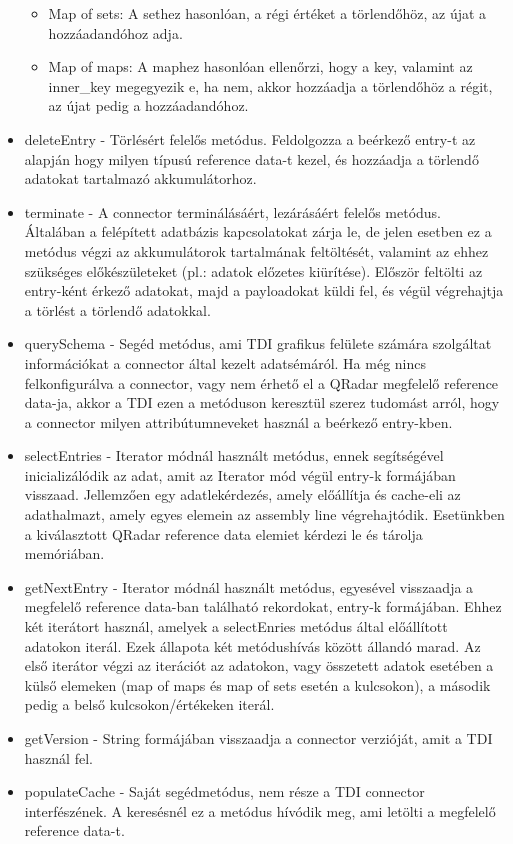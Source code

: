 \begin{itemize}
\begin{itemize}
		\item Map of sets: A sethez hasonlóan, a régi értéket a törlendőhöz, az újat a hozzáadandóhoz adja.
		
		\item Map of maps: A maphez hasonlóan ellenőrzi, hogy a key, valamint az inner\_key megegyezik e, ha nem, akkor hozzáadja a törlendőhöz a régit, az újat pedig a hozzáadandóhoz.
	\end{itemize}

	\item deleteEntry - Törlésért felelős metódus. Feldolgozza a beérkező entry-t az alapján hogy milyen típusú reference data-t kezel, és hozzáadja a törlendő adatokat tartalmazó akkumulátorhoz.
	
	\item terminate - A connector terminálásáért, lezárásáért felelős metódus. Általában a felépített adatbázis kapcsolatokat zárja le, de jelen esetben ez a metódus végzi az akkumulátorok tartalmának feltöltését, valamint az ehhez szükséges előkészületeket (pl.: adatok előzetes kiürítése). Először feltölti az entry-ként érkező adatokat, majd a payloadokat küldi fel, és végül végrehajtja a törlést a törlendő adatokkal.
	
	\item querySchema - Segéd metódus, ami TDI grafikus felülete számára szolgáltat információkat a connector által kezelt adatsémáról. Ha még nincs felkonfigurálva a connector, vagy nem érhető el a QRadar megfelelő reference data-ja, akkor a TDI ezen a metóduson keresztül szerez tudomást arról, hogy a connector milyen attribútumneveket használ a beérkező entry-kben.
		
	\item selectEntries - Iterator módnál használt metódus, ennek segítségével inicializálódik az adat, amit az Iterator mód végül entry-k formájában visszaad. Jellemzően egy adatlekérdezés, amely előállítja és cache-eli az adathalmazt, amely egyes elemein az assembly line végrehajtódik. Esetünkben a kiválasztott QRadar reference data elemiet kérdezi le és tárolja memóriában.
	
	\item getNextEntry - Iterator módnál használt metódus, egyesével visszaadja a megfelelő reference data-ban található rekordokat, entry-k formájában. Ehhez két iterátort használ, amelyek a selectEnries metódus által előállított adatokon iterál. Ezek állapota két metódushívás között állandó marad. Az első iterátor végzi az iterációt az adatokon, vagy összetett adatok esetében a külső elemeken (map of maps és map of sets esetén a kulcsokon), a második pedig a belső kulcsokon/értékeken iterál.
	
	\item getVersion - String formájában visszaadja a connector verzióját, amit a TDI használ fel.
	
	\item populateCache - Saját segédmetódus, nem része a TDI connector interfészének. A keresésnél ez a metódus hívódik meg, ami letölti a megfelelő reference data-t.

\end{itemize}

